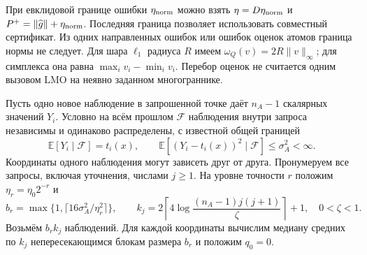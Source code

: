 При евклидовой границе ошибки $\eta_{\rm norm}$ можно взять
$\eta=D\eta_{\rm norm}$ и $P^+=\|\widehat g\|+\eta_{\rm norm}$.
Последняя граница позволяет использовать совместный сертификат.
Из одних направленных ошибок или ошибок оценок атомов граница
нормы не следует.
Для шара $\ell_1$ радиуса $R$ имеем $\omega_Q(v)=2R\|v\|_\infty$;
для симплекса она равна $\max_i v_i-\min_i v_i$.
Перебор оценок не считается одним вызовом LMO на неявно заданном многограннике.

Пусть одно новое наблюдение в запрошенной точке даёт $n_A-1$
скалярных значений $Y_i$.
Условно на всём прошлом $\mathcal F$ наблюдения внутри запроса
независимы и одинаково распределены, с известной общей границей
\begin{equation}\label{diroracle:moment}
 \mathbb E[Y_i\mid\mathcal F]=t_i(x),\qquad
 \mathbb E[(Y_i-t_i(x))^2\mid\mathcal F]\le\sigma_A^2<\infty.
\end{equation}
Координаты одного наблюдения могут зависеть друг от друга.
Пронумеруем все запросы, включая уточнения, числами $j\ge1$.
На уровне точности $r$ положим $\eta_r=\eta_0 2^{-r}$ и
\begin{equation}\label{diroracle:batch}
 b_r=\max\{1,\lceil16\sigma_A^2/\eta_r^2\rceil\},\qquad
 k_j=2\left\lceil4\log\frac{(n_A-1)j(j+1)}\zeta\right\rceil+1,
 \quad 0<\zeta<1.
\end{equation}
Возьмём $b_rk_j$ наблюдений.
Для каждой координаты вычислим медиану средних по $k_j$
непересекающимся блокам размера $b_r$ и положим $q_0=0$.

